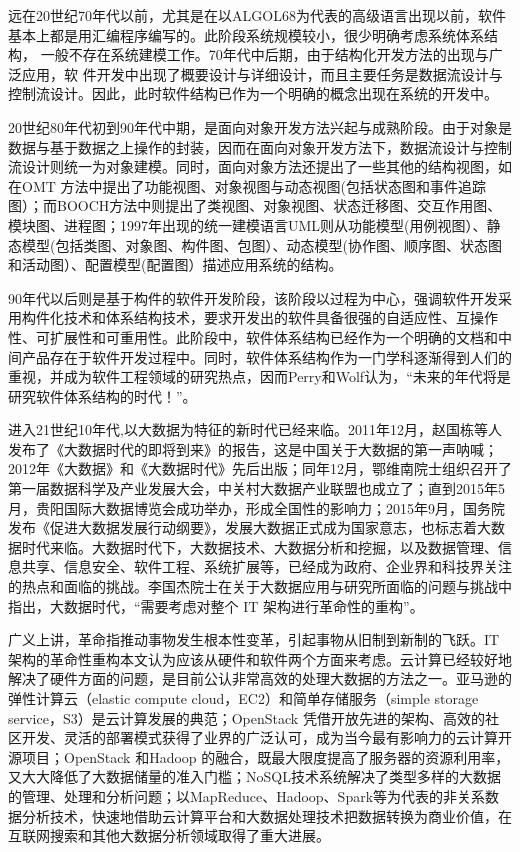 \documentclass[article]{BJTU-thesis}
\begin{document}
	远在20世纪70年代以前，尤其是在以ALGOL68为代表的高级语言出现以前，软件基本上都是用汇编程序编写的。此阶段系统规模较小，很少明确考虑系统体系结构， 一般不存在系统建模工作。70年代中后期，由于结构化开发方法的出现与广泛应用，软 件开发中出现了概要设计与详细设计，而且主要任务是数据流设计与控制流设计。因此，此时软件结构已作为一个明确的概念出现在系统的开发中。
	
	20世纪80年代初到90年代中期，是面向对象开发方法兴起与成熟阶段。由于对象是数据与基于数据之上操作的封装，因而在面向对象开发方法下，数据流设计与控制流设计则统一为对象建模。同时，面向对象方法还提出了一些其他的结构视图，如在OMT 方法中提出了功能视图、对象视图与动态视图(包括状态图和事件追踪图）；而BOOCH方法中则提出了类视图、对象视图、状态迁移图、交互作用图、模块图、进程图；1997年出现的统一建模语言UML则从功能模型(用例视图）、静态模型(包括类图、对象图、构件图、包图）、动态模型(协作图、顺序图、状态图和活动图）、配置模型(配置图）描述应用系统的结构\cite{a}。
	
	90年代以后则是基于构件的软件开发阶段，该阶段以过程为中心，强调软件开发采用构件化技术和体系结构技术，要求开发出的软件具备很强的自适应性、互操作性、可扩展性和可重用性。此阶段中，软件体系结构已经作为一个明确的文档和中间产品存在于软件开发过程中。同时，软件体系结构作为一门学科逐渐得到人们的重视，并成为软件工程领域的研究热点，因而Perry和Wolf认为，``未来的年代将是研究软件体系结构的时代！''。
	
  	进入21世纪10年代,以大数据为特征的新时代已经来临。2011年12月，赵国栋等人发布了《大数据时代的即将到来》的报告，这是中国关于大数据的第一声呐喊；2012年《大数据》和《大数据时代》先后出版；同年12月，鄂维南院士组织召开了第一届数据科学及产业发展大会，中关村大数据产业联盟也成立了；直到2015年5月，贵阳国际大数据博览会成功举办，形成全国性的影响力；2015年9月，国务院发布《促进大数据发展行动纲要》，发展大数据正式成为国家意志，也标志着大数据时代来临。大数据时代下，大数据技术、大数据分析和挖掘，以及数据管理、信息共享、信息安全、软件工程、系统扩展等，已经成为政府、企业界和科技界关注的热点和面临的挑战。李国杰院士在关于大数据应用与研究所面临的问题与挑战中指出，大数据时代，“需要考虑对整个 IT 架构进行革命性的重构”。
  	
  	广义上讲，革命指推动事物发生根本性变革，引起事物从旧制到新制的飞跃。IT架构的革命性重构本文认为应该从硬件和软件两个方面来考虑。云计算已经较好地解决了硬件方面的问题，是目前公认非常高效的处理大数据的方法之一。亚马逊的弹性计算云（elastic compute cloud，EC2）和简单存储服务（simple storage service，S3）是云计算发展的典范；OpenStack 凭借开放先进的架构、高效的社区开发、灵活的部署模式获得了业界的广泛认可，成为当今最有影响力的云计算开源项目；OpenStack 和Hadoop 的融合，既最大限度提高了服务器的资源利用率，又大大降低了大数据储量的准入门槛；NoSQL技术系统解决了类型多样的大数据的管理、处理和分析问题；以MapReduce、Hadoop、Spark等为代表的非关系数据分析技术，快速地借助云计算平台和大数据处理技术把数据转换为商业价值，在互联网搜索和其他大数据分析领域取得了重大进展。
  	
\end{document}
